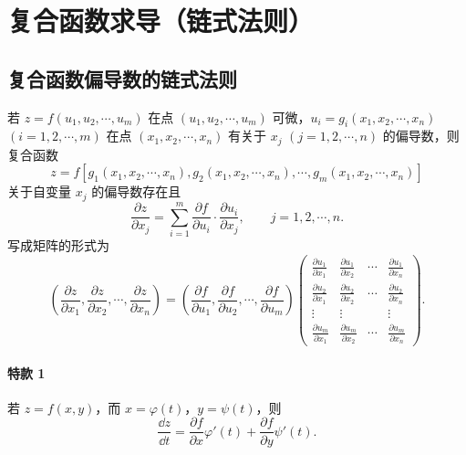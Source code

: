 \section{复合函数求导（链式法则）}

\subsection{复合函数偏导数的链式法则}

若 $z=f(u_1,u_2,\cdots,u_m)$ 在点 $(u_1,u_2,\cdots,u_m)$ 可微，$u_i=g_i(x_1,x_2,\cdots,x_n)$ $(i=1,2,\cdots,m)$ 在点 $(x_1,x_2,\cdots,x_n)$ 有关于 $x_j$ $(j=1,2,\cdots,n)$ 的偏导数，则复合函数
\[
  z=f[g_1(x_1,x_2,\cdots,x_n),g_2(x_1,x_2,\cdots,x_n),\cdots,g_m(x_1,x_2,\cdots,x_n)]
\]
关于自变量 $x_j$ 的偏导数存在且
\begin{equation}
  \frac{\partial z}{\partial x_j}
  =\sum_{i=1}^m\frac{\partial f}{\partial u_i}\cdot\frac{\partial u_i}{\partial x_j},
  \qquad j=1,2,\cdots,n.
  \tag{19.2}
  \label{eq:19.2}
\end{equation}
写成矩阵的形式为
\[
  \left(\frac{\partial z}{\partial x_1},\frac{\partial z}{\partial x_2},\cdots,\frac{\partial z}{\partial x_n}\right)
  =\left(\frac{\partial f}{\partial u_1},\frac{\partial f}{\partial u_2},\cdots,\frac{\partial f}{\partial u_m}\right)
  \begin{pmatrix}
    \frac{\partial u_1}{\partial x_1} & \frac{\partial u_1}{\partial x_2} & \cdots & \frac{\partial u_1}{\partial x_n}\\
    \frac{\partial u_2}{\partial x_1} & \frac{\partial u_2}{\partial x_2} & \cdots & \frac{\partial u_2}{\partial x_n}\\
    \vdots & \vdots & & \vdots\\
    \frac{\partial u_m}{\partial x_1} & \frac{\partial u_m}{\partial x_2} & \cdots & \frac{\partial u_m}{\partial x_n}
  \end{pmatrix}.
\]

\paragraph{特款 1}
若 $z=f(x,y)$，而 $x=\varphi(t)$，$y=\psi(t)$，则
\begin{equation}
  \frac{\dd z}{\dd t}=\frac{\partial f}{\partial x}\varphi'(t)+\frac{\partial f}{\partial y}\psi'(t).
  \tag{19.3}
  \label{eq:19.3}
\end{equation}

